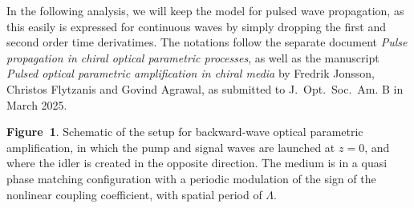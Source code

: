 %
%
\newcount\subref
\def\eqsubreftext#1#2{%
  \subref = #2           %
  \advance\subref by 96  %
  #1{\rm\char\subref}%
}

%
%
\def\boxit#1{\vbox{\hrule\hbox{\vrule\kern3pt
  \vbox{\kern3pt#1\kern3pt}\kern3pt\vrule}\hrule}}

\def\date{April 6, 2025}
\def\author{Fredrik Jonsson}
\vskip24pt
\noindent
In the following analysis, we will keep the model for pulsed wave propagation,
as this easily is expressed for continuous waves by simply dropping the first
and second order time derivatimes. The notations follow the separate document
{\it Pulse propagation in chiral optical parametric processes}, as well as the
manuscript {\it Pulsed optical parametric amplification in chiral media} by
Fredrik Jonsson, Christos Flytzanis and Govind Agrawal, as submitted to
J.~Opt.~Soc.~Am. B in March 2025.
\bigskip
\centerline{\epsfxsize=90mm}
\medskip
\noindent
{\bf Figure~1}.
Schematic of the setup for backward-wave optical parametric amplification, in
which the pump and signal waves are launched at $z=0$, and where the idler is
created in the opposite direction. The medium is in a quasi phase matching
configuration with a periodic modulation of the sign of the nonlinear coupling
coefficient, with spatial period of $\Lambda$.

